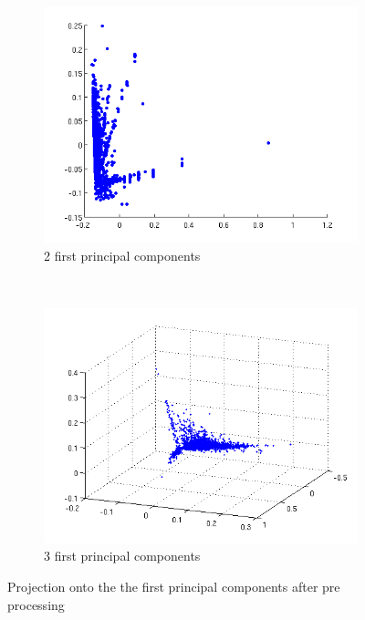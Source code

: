 \documentclass[a4paper,10pt]{article}
\begin{document}
\begin{figure}[h!]
\centering
\begin{subfigure}[b]{0.5\textwidth}
\includegraphics[width=\textwidth]{Images/processed.png}
\caption{2 first principal components}
\label{fig:pca2}
\end{subfigure}%
~ %
\begin{subfigure}[b]{0.5\textwidth}
\includegraphics[width=\textwidth]{Images/pca3d.png}
\caption{3 first principal components}
\label{fig:pca3}
\end{subfigure}
\caption{Projection onto the the first principal components after pre processing}
\label{fig:pca}
\end{figure}
\end{document}
